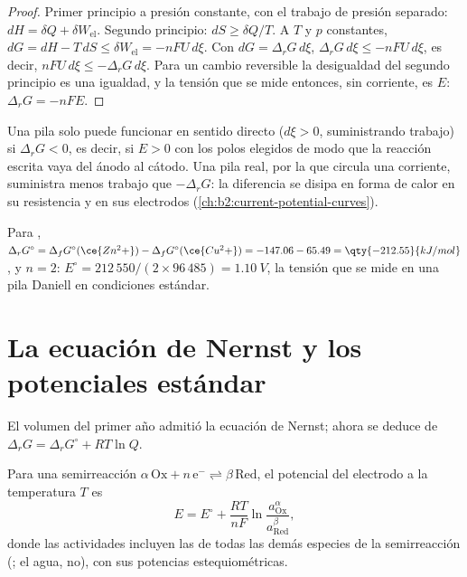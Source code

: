 \begin{proof}
Primer principio a presión constante, con el trabajo de presión separado:
$dH = \delta Q + \delta W_{\text{el}}$. Segundo principio: $dS \geq \delta Q/T$. A
$T$ y $p$ constantes, $dG = dH - T\,dS \leq \delta W_{\text{el}} = -nFU\,d\xi$.
Con $dG = \Delta_r G\,d\xi$, $\Delta_r G\,d\xi \leq -nFU\,d\xi$, es decir,
$nFU\,d\xi \leq -\Delta_r G\,d\xi$. Para un cambio reversible la desigualdad
del segundo principio es una igualdad, y la tensión que se mide entonces, sin
corriente, es $E$: $\Delta_r G = -nFE$.
\end{proof}

Una pila solo puede funcionar en sentido directo ($d\xi > 0$, suministrando trabajo) si $\Delta_r G <
0$, es decir, si $E > 0$ con los polos elegidos de modo que la reacción escrita vaya
del ánodo al cátodo. Una pila real, por la que circula una corriente, suministra
menos trabajo que $-\Delta_r G$: la diferencia se disipa en forma de calor en su
resistencia y en sus electrodos (\cref{ch:b2:current-potential-curves}).

\begin{example}\label{ex:b2:cell-thermodynamics:daniell}
Para , $\Delta_r G^\circ = \Delta_f G^\circ(\ce{Zn^2+}) -
\Delta_f G^\circ(\ce{Cu^2+}) = -147.06 - 65.49 = \qty{-212.55}{kJ/mol}$, y $n = 2$:
$E^\circ = 212\,550/(2 \times 96\,485) = \qty{1.10}{V}$, la tensión que se mide en una
pila Daniell en condiciones estándar.
\end{example}

\section{La ecuación de Nernst y los potenciales estándar}

El volumen del primer año admitió la ecuación de Nernst; ahora se deduce de
$\Delta_r G = \Delta_r G^\circ + RT\ln Q$.

\begin{theorem}\label{thm:b2:cell-thermodynamics:nernst-derived}
Para una semirreacción $\alpha\,\mathrm{Ox} + n\,\mathrm e^- \rightleftharpoons
\beta\,\mathrm{Red}$, el potencial del electrodo a la temperatura $T$ es
\[
  E = E^\circ + \frac{RT}{nF}\ln\frac{a_{\mathrm{Ox}}^{\alpha}}{a_{\mathrm{Red}}^{\beta}} ,
\]
donde las actividades incluyen las de todas las demás especies de la
semirreacción (; el agua, no), con sus potencias estequiométricas.
\end{theorem}

